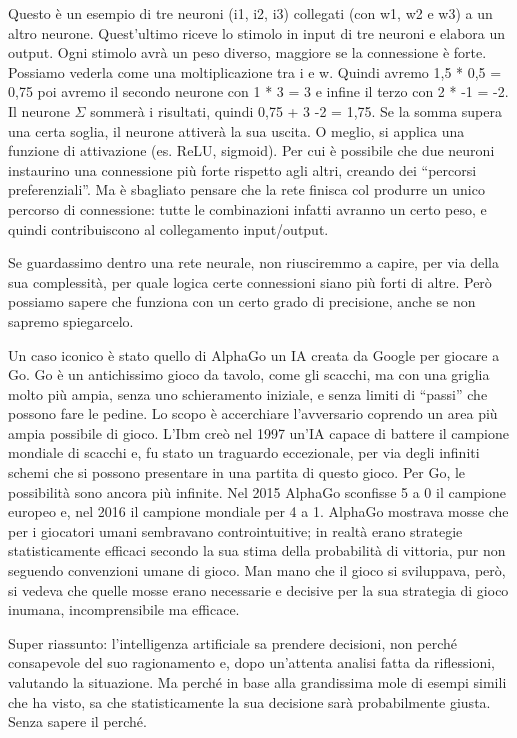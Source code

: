 \documentclass[12pt]{book} %
\begin{document}
Questo è un esempio di tre neuroni (i1, i2, i3) collegati (con w1, w2 e w3) a un altro neurone.
Quest'ultimo riceve lo stimolo in input di tre neuroni e elabora un output. Ogni stimolo avrà un
peso diverso, maggiore se la connessione è forte. Possiamo vederla come una moltiplicazione tra i e w. Quindi avremo
1,5 * 0,5 = 0,75 poi avremo il secondo neurone con 1 * 3 = 3 e infine il terzo con 2 * -1 = -2. Il neurone $\Sigma $
sommerà i risultati, quindi 0,75 + 3 -2 = 1,75. Se la somma supera una certa soglia, il neurone attiverà la sua uscita.
O meglio, si applica una funzione di attivazione (es. ReLU, sigmoid).
Per cui è possibile che due neuroni instaurino una connessione più forte rispetto agli altri, creando dei “percorsi
preferenziali”. Ma è sbagliato pensare che la rete finisca col produrre un unico percorso di connessione: tutte le
combinazioni infatti avranno un certo peso, e quindi contribuiscono al collegamento input/output.

Se guardassimo dentro una rete neurale, non riusciremmo a capire, per via della sua complessità, per quale logica certe
connessioni siano più forti di altre. Però possiamo sapere che funziona con un certo grado di precisione, anche se non
sapremo spiegarcelo. 

Un caso iconico è stato quello di AlphaGo un IA creata da Google per giocare a Go. Go è un antichissimo gioco da tavolo,
come gli scacchi, ma con una griglia molto più ampia, senza uno schieramento iniziale, e senza limiti di “passi” che
possono fare le pedine. Lo scopo è accerchiare l'avversario coprendo un area più ampia possibile
di gioco. L'Ibm creò nel 1997 un'IA capace di battere il campione mondiale di
scacchi e, fu stato un traguardo eccezionale, per via degli infiniti schemi che si possono presentare in una partita di
questo gioco. Per Go, le possibilità sono ancora più infinite. Nel 2015 AlphaGo sconfisse 5 a 0 il campione europeo e,
nel 2016 il campione mondiale per 4 a 1. AlphaGo mostrava mosse che per i giocatori umani sembravano controintuitive; in realtà erano strategie statisticamente efficaci secondo la sua stima della probabilità di vittoria, pur non seguendo convenzioni umane di gioco. Man mano che il gioco si sviluppava, però, si vedeva che quelle mosse erano necessarie e decisive per la
sua strategia di gioco inumana, incomprensibile ma efficace.

Super riassunto: l'intelligenza artificiale sa prendere decisioni, non perché consapevole del suo
ragionamento e, dopo un'attenta analisi fatta da riflessioni, valutando la situazione. Ma perché
in base alla grandissima mole di esempi simili che ha visto, sa che statisticamente la sua decisione sarà probabilmente
giusta. Senza sapere il perché.
\end{document}
